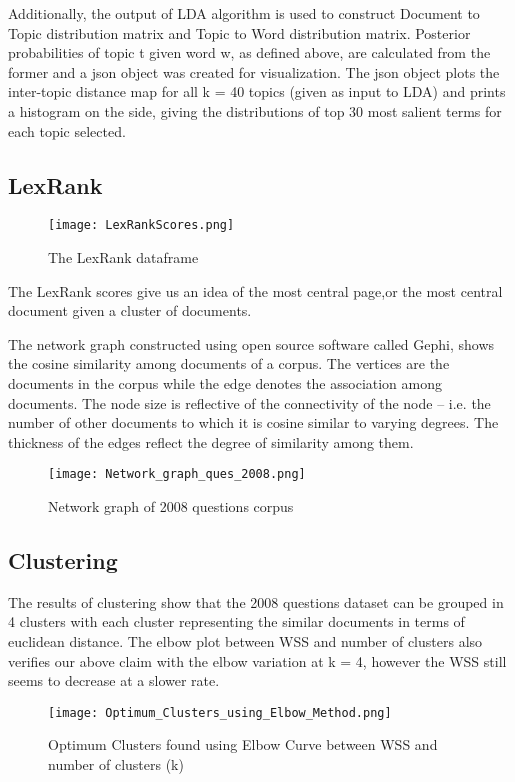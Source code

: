 \documentclass[journal]{IEEEtran}
\begin{document}
\noindent Additionally, the output of LDA algorithm is used to construct Document to Topic distribution matrix and Topic to Word distribution matrix. Posterior probabilities of topic t given word w, as defined above, are calculated from the former and a json object was created for visualization. The json object plots the inter-topic distance map for all k = 40 topics (given as input to LDA) and prints a histogram on the side, giving the distributions of top 30 most salient terms for each topic selected.

\subsection{LexRank}
 \begin{figure}[!htb]
\begin{center}
\texttt{[image: LexRankScores.png]}
\end{center}
\caption{The LexRank dataframe }
\end{figure}
\noindent The LexRank scores give us an idea of the most central page,or the most central document given a cluster of documents. 

\noindent The network graph constructed using open source software called Gephi, shows the cosine similarity among documents of a corpus. The vertices are the documents in the corpus while the edge denotes the association among documents. The node size is reflective of the connectivity of the node – i.e. the number of other documents to which it is cosine similar to varying degrees. The thickness of the edges reflect the degree of similarity among them.
\begin{figure}[!htb]
\begin{center}
\texttt{[image: Network\_graph\_ques\_2008.png]}
\end{center}
\caption{Network graph of 2008 questions corpus}
\end{figure}

\subsection{Clustering}
\noindent The results of clustering show that the 2008 questions dataset can be grouped in 4 clusters with each cluster representing the similar documents in terms of euclidean distance. The elbow plot between WSS and number of clusters also verifies our above claim with the elbow variation at k = 4, however the WSS still seems to decrease at a slower rate.
\begin{figure}[!htb]
\begin{center}
\texttt{[image: Optimum\_Clusters\_using\_Elbow\_Method.png]}
\end{center}
\caption{Optimum Clusters found using Elbow Curve between WSS and number of clusters (k)}
\end{figure}
\end{document}
